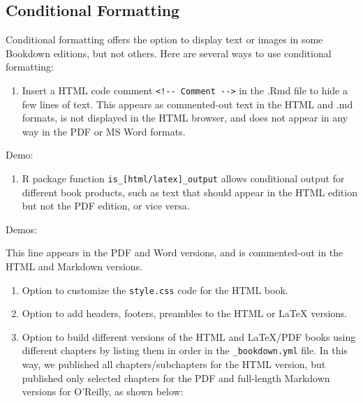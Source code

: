 \documentclass[
  english,
]{book}
\providecommand{\tightlist}{%
  \setlength{\itemsep}{0pt}\setlength{\parskip}{0pt}}
\begin{document}
\hypertarget{conditional-formatting}{%
\subsection*{Conditional Formatting}\label{conditional-formatting}}

Conditional formatting offers the option to display text or images in some Bookdown editions, but not others. Here are several ways to use conditional formatting:

\begin{enumerate}
\def\labelenumi{\arabic{enumi}.}
\tightlist
\item
  Insert a HTML code comment \texttt{\textless{}!-\/-\ Comment\ -\/-\textgreater{}} in the .Rmd file to hide a few lines of text. This appears as commented-out text in the HTML and .md formats, is not displayed in the HTML browser, and does not appear in any way in the PDF or MS Word formats.
\end{enumerate}

Demo:

\begin{enumerate}
\def\labelenumi{\arabic{enumi}.}
\setcounter{enumi}{1}
\tightlist
\item
  R package function \texttt{is\_{[}html/latex{]}\_output} allows conditional output for different book products, such as text that should appear in the HTML edition but not the PDF edition, or vice versa.
\end{enumerate}

Demos:

This line appears in the PDF and Word versions, and is commented-out in the HTML and Markdown versions.

\begin{enumerate}
\def\labelenumi{\arabic{enumi}.}
\setcounter{enumi}{2}
\item
  Option to customize the \texttt{style.css} code for the HTML book.
\item
  Option to add headers, footers, preambles to the HTML or LaTeX versions.
\item
  Option to build different versions of the HTML and LaTeX/PDF books using different chapters by listing them in order in the \texttt{\_bookdown.yml} file. In this way, we published all chapters/subchapters for the HTML version, but published only selected chapters for the PDF and full-length Markdown versions for O'Reilly, as shown below:
\end{enumerate}
\end{document}
